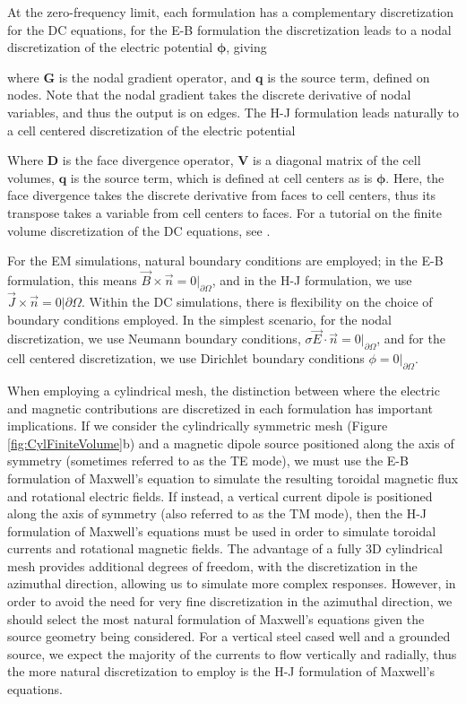\documentclass[preprint,review,3p,times,onecolumn,authoryear]{elsarticle}
\begin{document}
At the zero-frequency limit, each formulation has a complementary discretization for the DC equations, for the E-B formulation the discretization leads to a nodal discretization of the electric potential $\boldsymbol{\phi}$, giving

where $\mathbf{G}$ is the nodal gradient operator, and $\mathbf{q}$ is the source term, defined on nodes. Note that the nodal gradient takes the discrete derivative of nodal variables, and thus the output is on edges. The H-J formulation leads naturally to a cell centered discretization of the electric potential

Where $\mathbf{D}$ is the face divergence operator, $\mathbf{V}$ is a diagonal matrix of the cell volumes, $\mathbf{q}$ is the source term, which is  defined at cell centers as is $\boldsymbol{\phi}$. Here, the face divergence takes the discrete derivative from faces to cell centers, thus its transpose takes a variable from cell centers to faces. For a tutorial on the finite volume discretization of the DC equations, see \citep{Cockett2016}.

For the EM simulations, natural boundary conditions are employed; in the E-B formulation, this means $\vec{B}\times\vec{n} = 0\vert_{\partial \Omega}$, and in the H-J formulation, we use $\vec{J}\times\vec{n} = 0\vert{\partial \Omega}$. Within the DC simulations, there is flexibility on the choice of boundary conditions employed. In the simplest scenario, for the nodal discretization, we use Neumann boundary conditions, $\sigma\vec{E} \cdot \vec{n} = 0\vert_{\partial \Omega}$, and for the cell centered discretization, we use Dirichlet boundary conditions $\phi = 0\vert_{\partial \Omega}$.

When employing a cylindrical mesh, the distinction between where the electric and magnetic contributions are discretized in each formulation has important implications. If we consider the cylindrically symmetric mesh (Figure \ref{fig:CylFiniteVolume}b) and a magnetic dipole source positioned along the axis of symmetry (sometimes referred to as the TE mode), we must use the E-B formulation of Maxwell's equation to simulate the resulting toroidal magnetic flux and rotational electric fields. If instead, a vertical current dipole is positioned along the axis of symmetry (also referred to as the TM mode), then the H-J formulation of Maxwell's equations must be used in order to simulate toroidal currents and rotational magnetic fields. The advantage of a fully 3D cylindrical mesh provides additional degrees of freedom, with the discretization in the azimuthal direction, allowing us to simulate more complex responses. However, in order to avoid the need for very fine discretization in the azimuthal direction, we should select the most natural formulation of Maxwell's equations given the source geometry being considered. For a vertical steel cased well and a grounded source, we expect the majority of the currents to flow vertically and radially, thus the more natural discretization to employ is the H-J formulation of Maxwell's equations.
\end{document}
